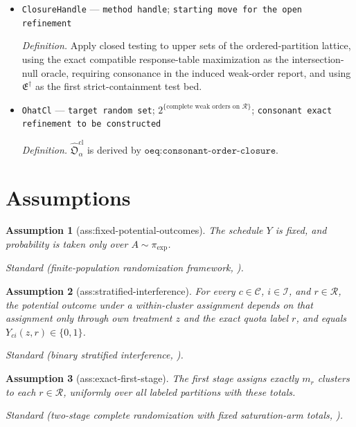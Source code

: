 \documentclass{article}
\newtheorem{assumption}{Assumption}
\begin{document}
\begin{itemize}
  \item \texttt{ClosureHandle} --- \texttt{method handle}; \texttt{starting move for the open refinement}
  \par\smallskip\noindent\emph{Definition.} Apply closed testing to upper sets of the ordered-partition lattice, using the exact compatible response-table maximization as the intersection-null oracle, requiring consonance in the induced weak-order report, and using \(\mathfrak E^\dagger\) as the first strict-containment test bed.
  \item \texttt{OhatCl} --- \texttt{target random set}; \(2^{\{\text{complete weak orders on }\mathcal R\}}\); \texttt{consonant exact refinement to be constructed}
  \par\smallskip\noindent\emph{Definition.} \(\widehat{\mathfrak O}^{\mathrm{cl}}_{\alpha}\) is derived by \(\texttt{oeq:consonant-order-closure}\).
\end{itemize}

\section{Assumptions}

\begin{assumption}[ass:fixed-potential-outcomes]\label{ass:fixed-potential-outcomes}
The schedule \(Y\) is fixed, and probability is taken only over \(A\sim\pi_{\exp}\).
\par\smallskip\noindent\emph{Standard} (finite-population randomization framework, \cite{RigdonHudgens2015}).
\end{assumption}

\begin{assumption}[ass:stratified-interference]\label{ass:stratified-interference}
For every \(c\in\mathcal C\), \(i\in\mathcal I\), and \(r\in\mathcal R\), the potential outcome under a within-cluster assignment depends on that assignment only through own treatment \(z\) and the exact quota label \(r\), and equals \(Y_{ci}(z,r)\in\{0,1\}\).
\par\smallskip\noindent\emph{Standard} (binary stratified interference, \cite{RigdonHudgens2015}).
\end{assumption}

\begin{assumption}[ass:exact-first-stage]\label{ass:exact-first-stage}
The first stage assigns exactly \(m_r\) clusters to each \(r\in\mathcal R\), uniformly over all labeled partitions with these totals.
\par\smallskip\noindent\emph{Standard} (two-stage complete randomization with fixed saturation-arm totals, \cite{JiangImaiMalani2023}).
\end{assumption}
\end{document}

